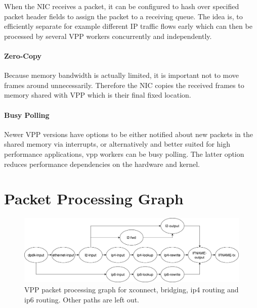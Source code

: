 When the NIC receives a packet, it can be configured to hash over
specified packet header fields to assign the packet to a receiving
queue. The idea is, to efficiently separate for example different IP
traffic flows early which can then be processed by several VPP workers
concurrently and independently. \cite{linguaglossa2017high}

\paragraph{Zero-Copy}

Because memory bandwidth is actually limited, it is important not to
move frames around unnecessarily. Therefore the NIC copies the
received frames to memory shared with VPP which is their final fixed
location. \cite{linguaglossa2017high}

\paragraph{Busy Polling}

Newer VPP versions have options to be either notified about new
packets in the shared memory via interrupts, or alternatively and
better suited for high performance applications, \Ac{vpp} workers can
be busy polling. The latter option reduces performance dependencies on
the hardware and kernel. \cite{vppdocs:rxmodes}


\section{Packet Processing Graph}

\begin{figure}[!ht]
\noindent\hspace{0.5mm}\includegraphics[width=\linewidth]{pics/vpp-nodes-horizontal.png}
\caption{VPP packet processing graph for xconnect, bridging, \Ac{ip4} routing and \Ac{ip6} routing. Other paths are left out. }
\label{nodegraph}
\end{figure}

